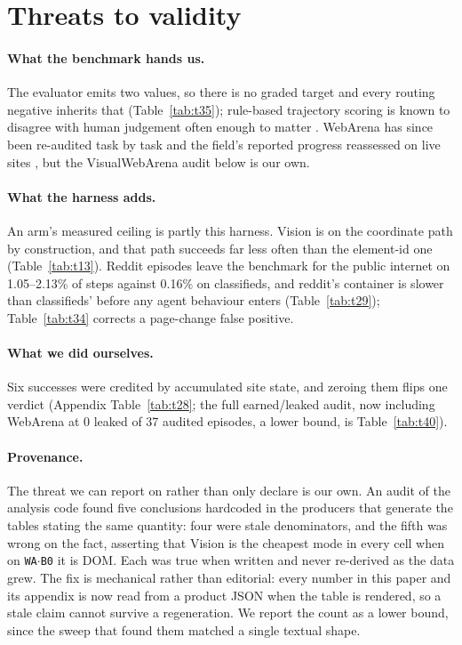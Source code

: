 \section{Threats to validity}\label{sec:threats}

 \paragraph{What the benchmark hands us.} The evaluator emits two values, so there is no graded target and every routing negative inherits that (Table~\ref{tab:t35}); rule-based trajectory scoring is known to disagree with human judgement often enough to matter \citep{lu2025agentrewardbench}. WebArena has since been re-audited task by task \citep{elhattami2025webarenaverified} and the field's reported progress reassessed on live sites \citep{xue2025illusion}, but the VisualWebArena audit below is our own.

 \paragraph{What the harness adds.} An arm's measured ceiling is partly this harness. Vision is on the coordinate path by construction, and that path succeeds far less often than the element-id one (Table~\ref{tab:t13}). Reddit episodes leave the benchmark for the public internet on 1.05--2.13\% of steps against 0.16\% on classifieds, and reddit's container is slower than classifieds' before any agent behaviour enters (Table~\ref{tab:t29}); Table~\ref{tab:t34} corrects a page-change false positive.

\paragraph{What we did ourselves.} Six successes were credited by accumulated site state, and zeroing them flips one verdict (Appendix Table~\ref{tab:t28}; the full earned/leaked audit, now including WebArena at 0 leaked of 37 audited episodes, a lower bound, is Table~\ref{tab:t40}).

\paragraph{Provenance.}  The threat we can report on rather than only declare is our own. An audit of the analysis code found five conclusions hardcoded in the producers that generate the tables stating the same quantity: four were stale denominators, and the fifth was wrong on the fact, asserting that Vision is the cheapest mode in every cell when on \texttt{WA$\cdot$B0} it is DOM. Each was true when written and never re-derived as the data grew. The fix is mechanical rather than editorial: every number in this paper and its appendix is now read from a product JSON when the table is rendered, so a stale claim cannot survive a regeneration. We report the count as a lower bound, since the sweep that found them matched a single textual shape.
